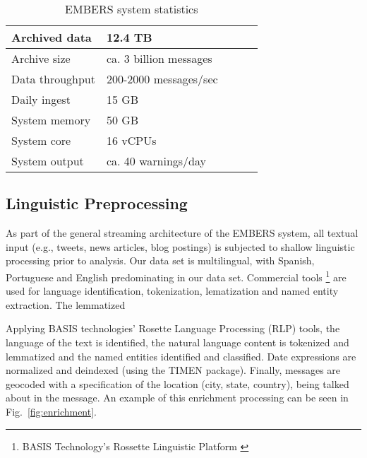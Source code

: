 
\begin{table}
\caption{EMBERS system statistics}
 \centering
 \begin{tabular}{|l|l|l|l|l|}
 \hline
 Archived data     & 12.4 TB                  \\ \hline
 Archive size & ca. 3 billion messages   \\ \hline
 Data throughput   & 200-2000 messages/sec  \\ \hline
 Daily ingest & 15 GB \\ \hline
 System memory & 50 GB \\ \hline
 System core & 16 vCPUs \\ \hline
 System output & ca. 40 warnings/day \\ \hline
\end{tabular}
\label{tab:stats}
\end{table}



\subsection{Linguistic Preprocessing}

As part of the general streaming architecture of the EMBERS system,
all textual input (e.g., tweets, news articles, blog postings) is
subjected to shallow linguistic processing prior to analysis.  Our
data set is multilingual, with Spanish, Portuguese and English
predominating in our data set. Commercial tools \footnote{BASIS
  Technology's Rossette Linguistic Platform \cite{}} are used for language
identification, tokenization, lematization and named entity
extraction. The lemmatized

Applying BASIS
technologies' Rosette Language Processing (RLP) tools, the language of
the text is identified, the natural language content is tokenized and
lemmatized and the named entities identified and classified. Date
expressions are normalized and deindexed (using the TIMEN
\cite{LlorensDGS12} package).  Finally, messages are geocoded with a
specification of the location (city, state, country), being talked
about in the message.  An example of this enrichment processing can be
seen in Fig.~\ref{fig:enrichment}.


%
%

